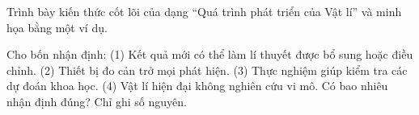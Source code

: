 \begin{bt}
Trình bày kiến thức cốt lõi của dạng “Quá trình phát triển của Vật lí” và minh họa bằng một ví dụ.
\end{bt}

\begin{ex}
Cho bốn nhận định: (1) Kết quả mới có thể làm lí thuyết được bổ sung hoặc điều chỉnh. (2) Thiết bị đo cản trở mọi phát hiện. (3) Thực nghiệm giúp kiểm tra các dự đoán khoa học. (4) Vật lí hiện đại không nghiên cứu vi mô. Có bao nhiêu nhận định đúng? Chỉ ghi số nguyên.
\end{ex}



